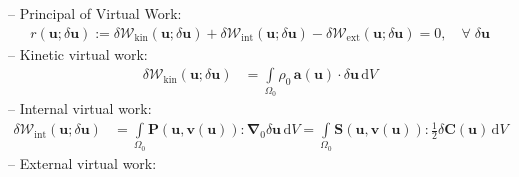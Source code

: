\documentclass[a4paper,12pt]{report}
\newcommand{\bs}[1]{\boldsymbol{#1}}
\newcommand{\Om}{\mathit{\Omega}}
\begin{document}
-- Principal of Virtual Work:
\begin{equation}
\label{equation-solid-weak-form}
\begin{aligned}
r(\bs{u};\delta\bs{u}) := \delta \mathcal{W}_{\mathrm{kin}}(\bs{u};\delta\bs{u}) + \delta \mathcal{W}_{\mathrm{int}}(\bs{u};\delta\bs{u}) - \delta \mathcal{W}_{\mathrm{ext}}(\bs{u};\delta\bs{u}) = 0, \quad \forall \; \delta\bs{u}\end{aligned}
\end{equation}
-- Kinetic virtual work:
\begin{equation}
\label{equation-deltaw-kin}
\begin{aligned}
\delta \mathcal{W}_{\mathrm{kin}}(\bs{u};\delta\bs{u}) &= \int\limits_{\Om_{0}} \rho_{0}\,\bs{a}(\bs{u}) \cdot \delta\bs{u} \,\mathrm{d}V
\end{aligned}
\end{equation}
-- Internal virtual work:
\begin{equation}
\label{equation-deltaw-int}
\begin{aligned}
\delta \mathcal{W}_{\mathrm{int}}(\bs{u};\delta\bs{u}) &= \int\limits_{\Om_{0}} \bs{P}(\bs{u},\bs{v}(\bs{u})) : \bs{\nabla}_{0} \delta\bs{u} \,\mathrm{d}V = \int\limits_{\Om_{0}} \bs{S}(\bs{u},\bs{v}(\bs{u})) : \frac{1}{2}\delta\bs{C}(\bs{u}) \,\mathrm{d}V
\end{aligned}
\end{equation}
-- External virtual work:\\
\end{document}
